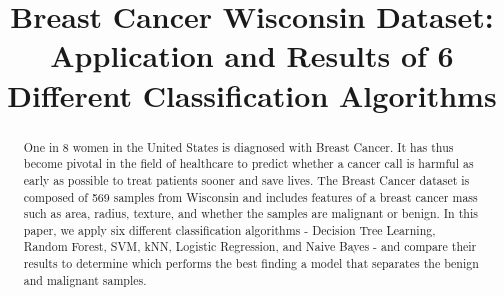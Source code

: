 \documentclass[conference]{IEEEtran}
\begin{document}
\title{Breast Cancer Wisconsin Dataset:\\ 
Application and Results of 6 Different Classification Algorithms}

\author{
\and
{}
\and
{}
}

\maketitle


\begin{abstract}
One in 8 women in the United States is diagnosed with Breast Cancer. It has thus become pivotal in the field of healthcare to predict whether a cancer call is harmful as early as possible to treat patients sooner and save lives. The Breast Cancer dataset is composed of 569 samples from Wisconsin and includes features of a breast cancer mass such as area, radius, texture, and whether the samples are malignant or benign. In this paper, we apply six different classification algorithms - Decision Tree Learning, Random Forest, SVM, kNN, Logistic Regression, and Naive Bayes - and compare their results to determine which performs the best finding a model that separates the benign and malignant samples.
\end{abstract}
\end{document}
